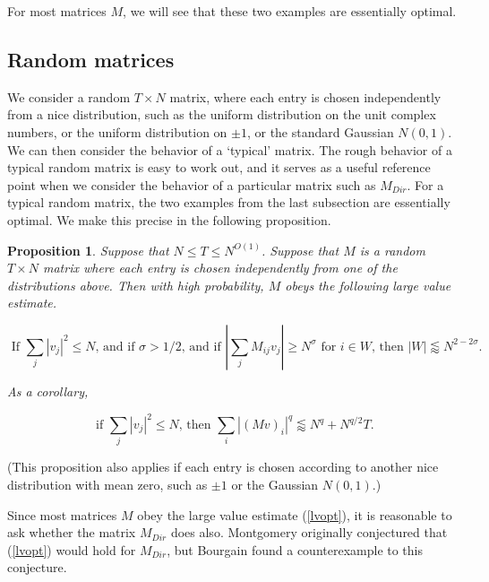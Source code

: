 \documentclass{amsart}
\newtheorem{prop}{Proposition}[section]
\begin{document}
For most matrices $M$, we will see that these two examples are essentially optimal.

\subsection{Random matrices} \label{subsecranmat}

We consider a random $T \times N$ matrix, where each entry is chosen independently from a nice distribution,  such as the uniform distribution on the unit complex numbers,  or the uniform distribution on $\pm 1$,  or the standard Gaussian $N(0,1)$.  
 We can then consider the behavior of a `typical' matrix.  The rough behavior of a typical random matrix is easy to work out, and it serves as a useful reference point when we consider the behavior of a particular matrix such as $M_{Dir}$.  For a typical random matrix, the two examples from the last subsection are essentially optimal.  We make this precise in the following proposition.  

\begin{prop} \label{proprandlv} Suppose that $N \le T \le N^{O(1)}$.   Suppose that $M$ is a random $T \times N$ matrix where each entry is chosen independently from one of the distributions above.    Then with high probability,  $M$ obeys the following large value estimate.

\begin{equation} \label{lvopt}
\textrm{ If $\sum_j |v_j|^2 \le N$,  and if $\sigma > 1/2$,  and if $| \sum_j M_{ij} v_j | \ge N^\sigma$ for $i \in W$,  then $|W| \lessapprox N^{2 - 2 \sigma}$.}
\end{equation}

As a corollary, 

\begin{equation} \label{lvoptlq}
\textrm{ if $\sum_j |v_j|^2 \le N$,  then $\sum_i  |(Mv)_i|^q \lessapprox N^q + N^{q/2} T$.}
 \end{equation}
\end{prop}

(This proposition also applies if each entry is chosen according to another nice distribution with mean zero, such as $\pm 1$ or the Gaussian $N(0,1)$.)

Since most matrices $M$ obey the large value estimate (\ref{lvopt}), it is reasonable to ask whether the matrix $M_{Dir}$ does also.  Montgomery originally conjectured that (\ref{lvopt}) would hold for $M_{Dir}$, but Bourgain found a counterexample to this conjecture.
\end{document}
